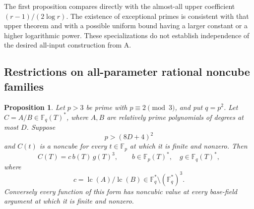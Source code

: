 \documentclass[11pt]{article}
\newtheorem{proposition}[theorem]{Proposition}
\theoremstyle{definition}
\theoremstyle{remark}
\begin{document}
The first proposition compares directly with the almost-all upper
coefficient $(r-1)/(2\log r)$.  The existence of exceptional
primes is consistent with that upper theorem and with a possible
uniform bound having a larger constant or a higher logarithmic
power.  These specializations do not establish independence of the
desired all-input construction from A.


\subsection{Restrictions on all-parameter rational noncube families}

\begin{proposition}\label{prop:rational-noncube-family}
Let $p>3$ be prime with $p\equiv2\pmod3$, and put $q=p^2$.
Let $C=A/B\in\mathbb F_q(T)^*$, where $A,B$ are relatively
prime polynomials of degrees at most $D$.  Suppose
\[
 p>(8D+4)^2
\]
and $C(t)$ is a noncube for every $t\in\mathbb F_p$ at which it
is finite and nonzero.  Then
\[
 C(T)=c\,b(T)\,g(T)^3,
 \qquad b\in\mathbb F_p(T)^*,\quad
 g\in\mathbb F_q(T)^*,
\]
where
\[
 c=\operatorname{lc}(A)/\operatorname{lc}(B)
       \in\mathbb F_q^*\setminus(\mathbb F_q^*)^3.
\]
Conversely every function of this form has noncubic value at every
base-field argument at which it is finite and nonzero.
\end{proposition}
\end{document}
